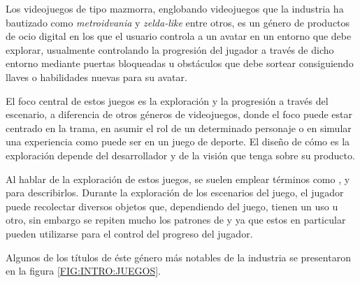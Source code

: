 Los videojuegos de tipo mazmorra, englobando videojuegos que la industria ha bautizado como \textit{metroidvania} y \textit{zelda-like} entre otros, es un género de productos de ocio digital en los que el usuario controla a un avatar en un entorno que debe explorar, usualmente controlando la progresión del jugador a través de dicho entorno mediante puertas bloqueadas u obstáculos que debe sortear consiguiendo llaves o habilidades nuevas para su avatar.

El foco central de estos juegos es la exploración y la progresión a través del escenario, a diferencia de otros géneros de videojuegos, donde el foco puede estar centrado en la trama, en asumir el rol de un determinado personaje o en simular una experiencia como puede ser en un juego de deporte. El diseño de cómo es la exploración depende del desarrollador y de la visión que tenga sobre su producto.

Al hablar de la exploración de estos juegos, se suelen emplear términos como ,  y  para describirlos. Durante la exploración de los escenarios del juego, el jugador puede recolectar diversos objetos que, dependiendo del juego, tienen un uso u otro, sin embargo se repiten mucho los patrones de  y  ya que estos en particular pueden utilizarse para el control del progreso del jugador.

Algunos de los títulos de éste género más notables de la industria se presentaron en la figura \ref{FIG:INTRO:JUEGOS}.